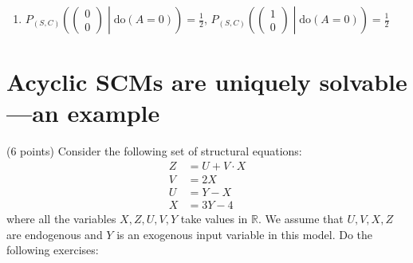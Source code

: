 \begin{gradedsolution}
\begin{enumerate}
      \item   $P_{(S,C)}\left( \begin{pmatrix} 0 \\ 0 \end{pmatrix} \middle| \text{do}(A=0)\right) = \frac{1}{2}$,   $P_{(S,C)}\left( \begin{pmatrix} 1 \\ 0 \end{pmatrix} \middle| \text{do}(A=0)\right) = \frac{1}{2}$
      \end{enumerate}
\end{gradedsolution}

\section{Acyclic SCMs are uniquely solvable---an example}
(6 points)
Consider the following set of structural equations:
\begin{align}
  Z & = U + V \cdot X \\
  V & = 2 X \\
  U & = Y - X \\
  X & = 3 Y - 4
  \label{eq:acyclic_structural_equations}
\end{align}
where all the variables $X, Z, U, V, Y$ take values in $\mathbb{R}$.
We assume that $U,V,X,Z$ are endogenous and $Y$ is an exogenous input variable in this model.
Do the following exercises:
